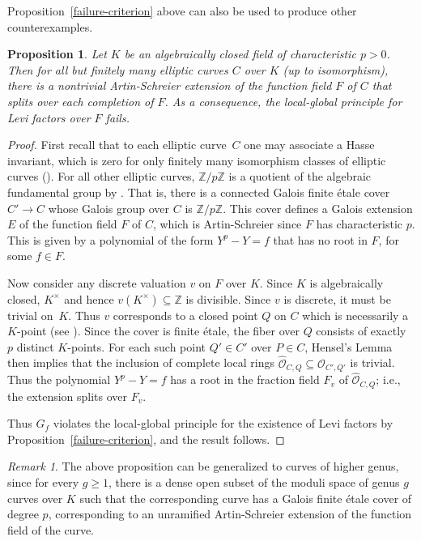 \documentclass[12pt]{amsart}
\newcommand{\mbb}[1]{\mathbb #1}
\newcommand{\mc}[1]{\mathcal #1}
\newcommand{\wh}{\widehat}
\theoremstyle{plain}
\newtheorem{prop}[thm]{Proposition}
\theoremstyle{definition}
\theoremstyle{remark}
\newtheorem{rem}[thm]{Remark}
\begin{document}
Proposition~\ref{failure-criterion} above can also be used to produce other counterexamples. 

\begin{prop}\label{elliptic}
Let $K$ be an algebraically closed field of characteristic $p>0$.  Then for all but finitely many elliptic curves $C$ over $K$ (up to isomorphism), there is a nontrivial Artin-Schreier  extension of the function field $F$ of $C$ that splits over each completion of $F$.  As a consequence, the local-global principle for Levi factors over $F$ fails.
\end{prop}
\begin{proof}
First recall that to each elliptic curve~$C$ one may associate a Hasse invariant, which is zero for only finitely many isomorphism classes of elliptic curves (\cite[Chapter IV, Corollary 4.23]{Hartshorne}). For all other elliptic curves, $\mbb Z/p\mbb Z$ is a quotient of the algebraic fundamental group by \cite[Chapter IV, Exercise~4.8]{Hartshorne}. 
That is, there is a connected Galois finite \'etale cover $C' \to C$ whose Galois group over $C$ is $\mbb Z/p\mbb Z$.  This cover defines a Galois extension $E$ of the function field $F$ of $C$, which is Artin-Schreier since $F$ has characteristic $p$.  This is given by a polynomial of the form $Y^p-Y=f$ that has no root in $F$, for some $f \in F$.  

Now consider any discrete valuation $v$ on $F$ over $K$.  Since $K$ is algebraically closed, $K^\times$ and hence $v(K^\times) \subseteq \mbb Z$ is divisible. Since $v$ is discrete, it must be trivial on~$K$. Thus $v$ corresponds to a closed point $Q$ on $C$ which is necessarily a $K$-point (see \cite[Chapter I, Corollaries~6.6, 6.10, 6.12]{Hartshorne}). Since the cover is finite \'etale, the fiber over $Q$ consists of exactly $p$ distinct $K$-points.  For each such point $Q' \in C'$ over $P \in C$, Hensel's Lemma then implies that the inclusion of complete local rings $\wh{\mc O}_{C,Q} \subseteq \wh{\mc O}_{C',Q'}$ is trivial.  Thus the polynomial $Y^p-Y=f$ has a root in the fraction field $F_v$ of $\wh{\mc O}_{C,Q}$; i.e., the extension splits over $F_v$.

Thus $G_f$ violates the local-global principle for the existence of Levi factors by Proposition~\ref{failure-criterion}, and the result follows.
\end{proof}

\begin{rem}
The above proposition can be generalized to curves of higher genus, since for every $g \ge 1$, there is a dense open subset of the moduli space of genus $g$ curves over $K$ such that the corresponding curve has a Galois finite \'etale cover of degree $p$, corresponding to an unramified Artin-Schreier extension of the function field of the curve.
\end{rem}
\end{document}
